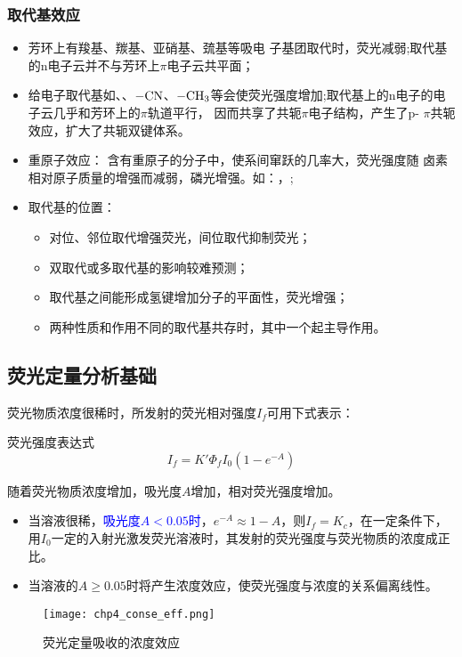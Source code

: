 \subsubsection{取代基效应}
\begin{itemize}
	\item 芳环上有羧基、羰基、亚硝基、巯基等吸电 子基团取代时，荧光减弱;取代基的n电子云并不与芳环上$\pi$电子云共平面；
	\item 给电子取代基如、、$\ce{-CN}$、$\ce{-CH_{3}}$等会使荧光强度增加;取代基上的n电子的电子云几乎和芳环上的$\pi$轨道平行， 因而共享了共轭$\pi$电子结构，产生了p- $\pi$共轭效应，扩大了共轭双键体系。
	\item 重原子效应： 含有重原子的分子中，使系间窜跃的几率大，荧光强度随 卤素相对原子质量的增强而减弱，磷光增强。如：，;
	\item 取代基的位置：
	\begin{itemize}
		\item 对位、邻位取代增强荧光，间位取代抑制荧光；
		\item 双取代或多取代基的影响较难预测；
		\item 取代基之间能形成氢键增加分子的平面性，荧光增强；
		\item 两种性质和作用不同的取代基共存时，其中一个起主导作用。
	\end{itemize}
\end{itemize}

\subsection{荧光定量分析基础}
荧光物质浓度很稀时，所发射的荧光相对强度$I_{f}$可用下式表示：
\begin{theorem*}{荧光强度表达式}
	\begin{equation*}
		I_{f}=K'\Phi_{f}I_{0}(1-e^{-A})
	\end{equation*}
\end{theorem*}
随着荧光物质浓度增加，吸光度$A$增加，相对荧光强度增加。
\begin{itemize}
	\item 当溶液很稀，\textcolor{blue}{吸光度$A<0.05$时}，$e^{-A}\approx 1-A$，则$I_{f}=K_{c}$，在一定条件下，用$I_0$一定的入射光激发荧光溶液时，其发射的荧光强度与荧光物质的浓度成正比。
	\item 当溶液的$A\geq 0.05$时将产生浓度效应，使荧光强度与浓度的关系偏离线性。
\end{itemize}
\begin{figure}
	\centering
	\texttt{[image: chp4\_conse\_eff.png]}
	\label{fig:chp4conseeff}
	\caption{荧光定量吸收的浓度效应}
\end{figure}

